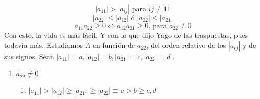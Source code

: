 \documentclass{article}
\newcommand\tab[1][0.6cm]{\hspace*{#1}}
\newcommand\nl{\newline\tab}
\begin{document}
	\begin{equation}\label{a}
	|a_{11}| > |a_{ij}| \text{ para } ij \neq 11 
	\end{equation}
	\begin{equation}\label{b}
	|a_{22}| \leq |a_{12}| \text{ ó } |a_{22}| \leq|a_{21}|
	\end{equation}
	\begin{equation}\label{c}
	a_{11}a_{22}\geq 0 \iff a_{12}a_{21}\geq 0\text{, para } a_{22} \neq 0
	\end{equation}\nl
	Con esto, la vida es más fácil. Y con lo que dijo Yago de las traspuestas, pues todavía más.
	\nl Estudiamos $A$ en función de $a_{22}$, del orden relativo de los $|a_{ij}|$ y de sus signos.\nl
	Sean $|a_{11}| = a, |a_{12}| = b, |a_{21}| = c, |a_{22}| = d $	.
	\begin{enumerate}
		\item $ a_{22} \neq 0$
			\begin{enumerate}
				
			\item \label{1}  
			$|a_{11}| > |a_{12}| \geq |a_{21}, \geq |a_{22}|   \equiv a > b \geq c, d$ \nl
			

\end{enumerate}
\end{enumerate}
\end{document}
